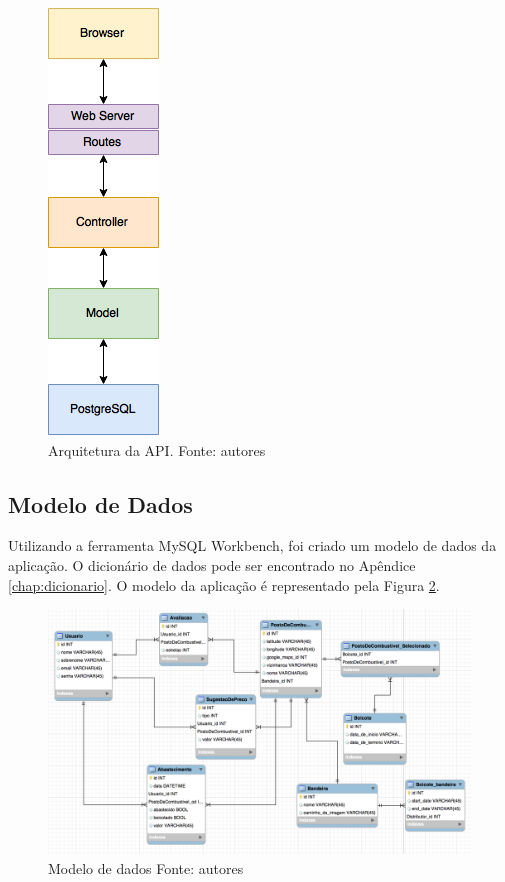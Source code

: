 \begin{figure}[H]
    \centering
    \includegraphics[scale=0.5]{figuras/api_arch.png}
    \caption[Arquitetura da API]{Arquitetura da API. Fonte: autores}
    \label{img:arquitetura}
\end{figure}


\subsection{Modelo de Dados}

Utilizando a ferramenta MySQL Workbench, foi criado um modelo de dados da aplicação. O dicionário de dados pode ser encontrado no Apêndice \ref{chap:dicionario}. O modelo da aplicação é representado pela Figura \ref{img:modelo_de_dados}.

\begin{figure}[H]
    \centering
    \includegraphics[scale=0.5]{figuras/modelagem_traduzida.png}
    \caption[Modelo de dados]{Modelo de dados Fonte: autores}
    \label{img:modelo_de_dados}
\end{figure}
